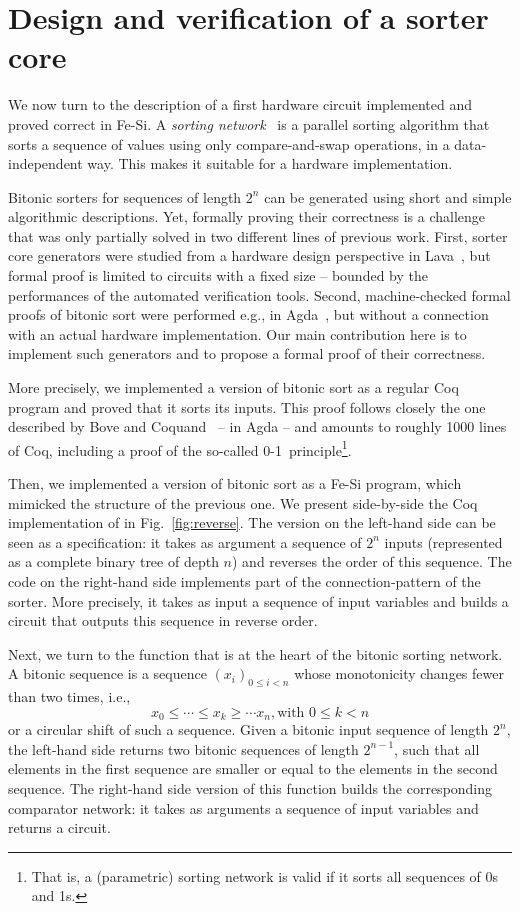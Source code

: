 \documentclass{llncs}
\begin{document}
\section{Design and verification of a sorter core}
We now turn to the description of a first hardware circuit implemented
and proved correct in Fe-Si. 
%
A \emph{sorting network}~\cite{DBLP:books/mg/CormenLRS01} is a
parallel sorting algorithm that sorts a sequence of values using only
compare-and-swap operations, in a data-independent way. This makes it
suitable for a hardware implementation.

Bitonic sorters for sequences of length $2^n$ can be generated using
short and simple algorithmic descriptions. Yet, formally proving their
correctness is a challenge that was only partially solved in two
different lines of previous work.
%
First, sorter core generators were studied from a hardware design
perspective in Lava~\cite{DBLP:conf/charme/ClaessenSS01}, but formal
proof is limited to circuits with a fixed size -- bounded by the
performances of the automated verification tools. 
%
Second, machine-checked formal proofs of bitonic sort were performed
e.g., in Agda~\cite{DBLP:conf/types/BoveC04}, but without a
connection with an actual hardware implementation. 
%
Our main contribution here is to implement such generators and to
propose a formal proof of their correctness.

More precisely, we implemented a version of bitonic sort as a regular
Coq program and proved that it sorts its inputs. This proof follows
closely the one described by Bove and
Coquand~\cite{DBLP:conf/types/BoveC04} -- in Agda -- and amounts to
roughly 1000 lines of Coq, including a proof of the so-called
\mbox{0-1~principle}\footnote{That is, a (parametric) sorting network
  is valid if it sorts all sequences of 0s and 1s.}.

Then, we implemented a version of bitonic sort as a Fe-Si program,
which mimicked the structure of the previous one. We present
side-by-side the Coq implementation of  in
Fig.~\ref{fig:reverse}.
%
The version on the left-hand side can be seen as a specification: it
takes as argument a sequence of $2^n$ inputs (represented as a
complete binary tree of depth $n$) and reverses the order of this
sequence.
%
The code on the right-hand side implements part of the
connection-pattern of the sorter. More precisely, it takes as input a
sequence of input variables and builds a circuit that outputs this
sequence in reverse order. 

Next, we turn to the function that is at the heart of the bitonic
sorting network.
%
A bitonic sequence is a sequence $(x_i)_{0 \le i < n}$ whose
monotonicity changes fewer than two times, i.e.,
$$ x_0 \le \cdots \le x_k \ge \cdots x_n, \text{with } 0 \le k < n $$
or a circular shift of such a sequence.
%
Given a bitonic input sequence of length $2^n$, the left-hand side
 returns two bitonic sequences of length $2^{n-1}$,
such that all elements in the first sequence are smaller or equal to
the elements in the second sequence. 
%
The right-hand side version of this function builds the corresponding
comparator network: it takes as arguments a sequence of input
variables and returns a circuit. 
\end{document}
